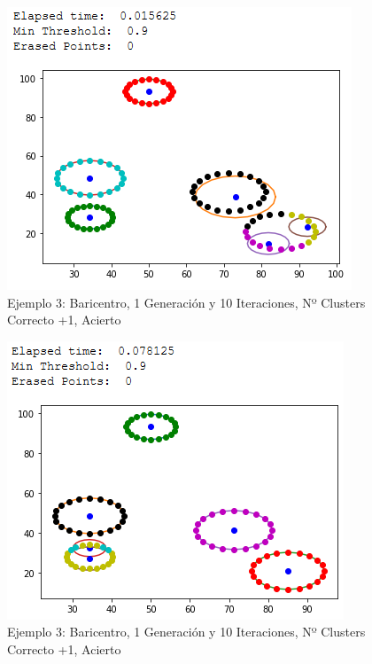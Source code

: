 \documentclass[conference,a4paper]{IEEEtran}
\begin{document}
\begin{figure}[H]
\centering
\includegraphics[scale=0.65]{Experimentacion/Ejemplo3/ej3_b_1_10_mc_correct}
\caption{Ejemplo 3: Baricentro, 1 Generación y 10 Iteraciones,  Nº Clusters Correcto +1, Acierto\\}
\end{figure}

\begin{figure}[H]
\centering
\includegraphics[scale=0.65]{Experimentacion/Ejemplo3/ej3_b_1_10_mc_correct2}
\caption{Ejemplo 3: Baricentro, 1 Generación y 10 Iteraciones,  Nº Clusters Correcto +1, Acierto\\}
\end{figure}
\end{document}
